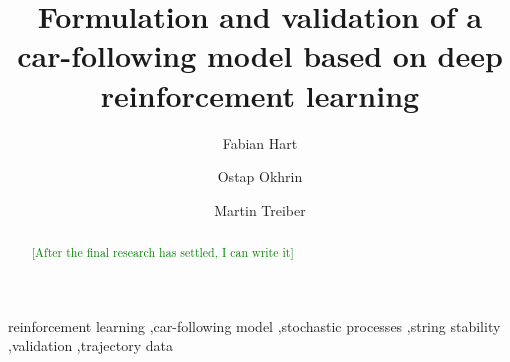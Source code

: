 \documentclass[review]{elsarticle}
\providecommand{\green}[1]{\textcolor{green}{#1}}
\providecommand{\martinc}[1]{\green{[#1]}} %
\providecommand{\3}{{\ss}}
\begin{document}
\begin{frontmatter}

\title{Formulation and validation of a car-following model based on deep
  reinforcement learning}


\author[firstAddress]{Fabian Hart}
\author[firstAddress,secondAddress]{Ostap Okhrin}
\author[firstAddress,secondAddress]{Martin Treiber}

\address[firstAddress]{TU Dresden}
\address[secondAddress]{Possible second address}




\begin{abstract}
\martinc{After the final research has settled, I can write it}
\end{abstract}

\begin{keyword}
reinforcement learning \sep car-following model \sep stochastic
processes \sep string stability \sep validation \sep trajectory data 
\end{keyword}

\end{frontmatter}

\end{document}
